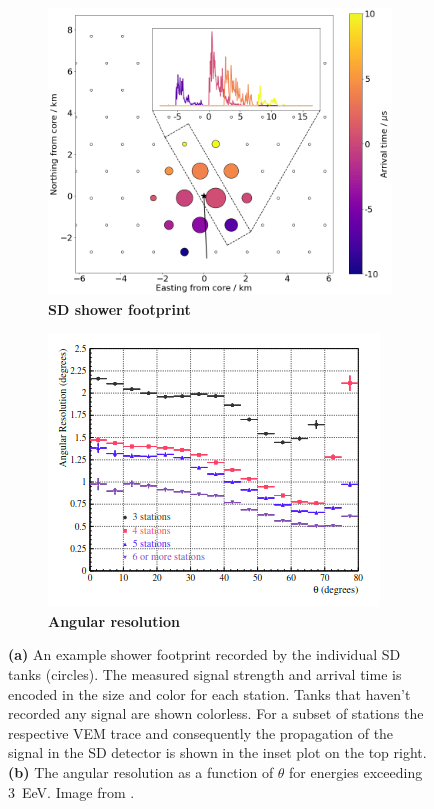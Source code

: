 \begin{figure}
	\begin{subfigure}[b]{0.5\textwidth}
		\centering
		\includegraphics[width=\textwidth]{./plots/shower_footprint.png}
		\caption{\textbf{SD shower footprint}}
		\label{fig:shower-footprint}
	\end{subfigure}
	\hfill
	\begin{subfigure}[b]{0.5\textwidth}
		\centering
		\includegraphics[width=\textwidth]{./plots/angular_resolution.png}
		\caption{\textbf{Angular resolution}}
		\label{fig:angular-resolution}
	\end{subfigure}
	\caption{
	\textbf{(a)} An example shower footprint recorded by the individual SD tanks (circles). The measured signal strength and arrival time is encoded in the	size 
	and color for each station. Tanks that haven't recorded any signal are shown colorless. For a subset of stations the respective VEM trace and consequently the
	propagation of the signal in the SD detector is shown in the inset plot on the top right.
	\textbf{(b)} The angular resolution as a function of $\theta$ for energies exceeding \SI{3}{\exa\electronvolt}. Image from \cite{bonifazi2005angular}.}
	\label{fig:offline-calibration}
\end{figure}

